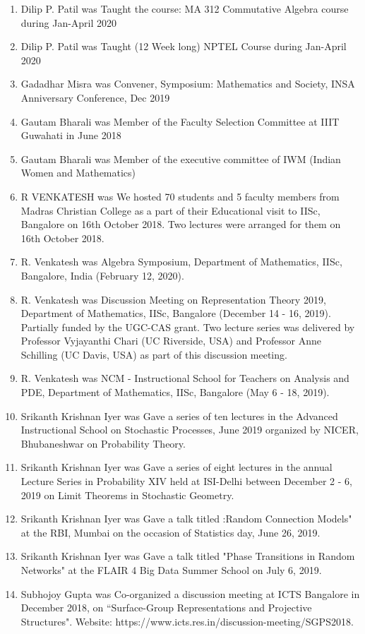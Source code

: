 \begin{enumerate}
\item Dilip P. Patil was Taught the course: MA 312 Commutative Algebra course during Jan-April 2020
\item Dilip P. Patil was Taught  (12 Week long)  NPTEL Course during Jan-April 2020
\item Gadadhar Misra was Convener, Symposium: Mathematics and Society, INSA Anniversary Conference, Dec 2019
\item Gautam Bharali was Member of the Faculty Selection Committee at IIIT Guwahati in June 2018
\item Gautam Bharali was Member of the executive committee of IWM (Indian Women and Mathematics)
\item R VENKATESH was We hosted 70 students and 5 faculty members from Madras Christian College as a part of their Educational visit to IISc, Bangalore on 16th October 2018. Two lectures were arranged for them on 16th October 2018.
\item R. Venkatesh was Algebra Symposium, Department of Mathematics, IISc, Bangalore, India (February 12, 2020).
\item R. Venkatesh was Discussion Meeting on Representation Theory 2019, Department of Mathematics, IISc, Bangalore (December 14 - 16, 2019). Partially funded by the UGC-CAS grant.  Two lecture series was delivered by Professor Vyjayanthi Chari (UC Riverside, USA) and Professor Anne Schilling (UC Davis, USA) as part of this discussion meeting.
\item R. Venkatesh was NCM - Instructional School for Teachers on Analysis and PDE, Department of Mathematics, IISc, Bangalore (May 6 - 18, 2019).
\item Srikanth Krishnan Iyer was Gave a series of ten lectures in the Advanced Instructional School on Stochastic Processes, June 2019 organized by NICER, Bhubaneshwar on Probability Theory.
\item Srikanth Krishnan Iyer was Gave a series of eight lectures in the annual Lecture Series in Probability XIV held at ISI-Delhi between December 2 - 6, 2019 on Limit Theorems in Stochastic Geometry.
\item Srikanth Krishnan Iyer was Gave a talk titled :Random Connection Models" at the RBI, Mumbai on the occasion of Statistics day, June 26, 2019.
\item Srikanth Krishnan Iyer was Gave a talk titled "Phase Transitions in Random Networks" at the FLAIR 4 Big Data Summer School on July 6, 2019.
\item Subhojoy Gupta was Co-organized a discussion meeting at ICTS Bangalore in December 2018, on “Surface-Group Representations and Projective Structures". Website: https://www.icts.res.in/discussion-meeting/SGPS2018.

\end{enumerate}
